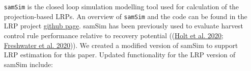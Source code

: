 \documentclass[11pt]{book}
\begin{document}
\clearpage

\label{app:samsim-appendix}

\texttt{samSim} is the closed loop simulation modelling tool used for calculation of the projection-based LRPs. An overview of \texttt{samSim} and the code can be found in the LRP project \href{https://github.com/Pacific-salmon-assess/samSim/tree/LRP}{github page}. samSim has been previously used to evaluate harvest control rule performance relative to recovery potential ((\protect\hyperlink{ref-holtQuantitativeToolEvaluating2020}{Holt et al. 2020}; \protect\hyperlink{ref-freshwaterBenefitsLimitationsIncreasing2020}{Freshwater et al. 2020})). We created a modified version of samSim to support LRP estimation for this paper. Updated functionality for the LRP version of samSim include:
\end{document}
